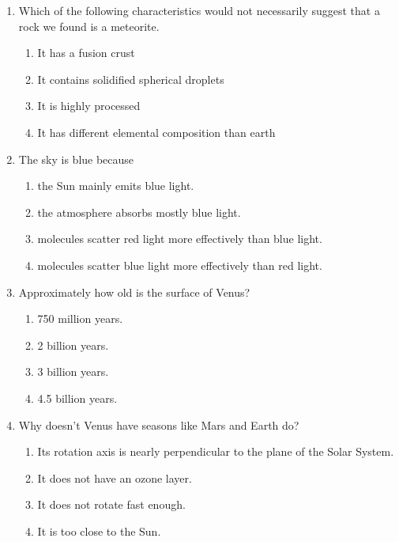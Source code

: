 \documentclass[12pt]{article}
\begin{document}
\begin{enumerate}[label=\arabic*.]
\begin{enumerate}[label=(\alph*)]
    \item Because the atmosphere preferentially scatters short wavelengths.
    \item Because the Earth's atmosphere preferentially absorbs all other colors.
\end{enumerate}
\item Which of the following characteristics would not necessarily suggest that a rock we found is a meteorite.
\begin{enumerate}[label=(\alph*)]
    \item It has a fusion crust
    \item It contains solidified spherical droplets
    \item It is highly processed
    \item It has different elemental composition than earth
\end{enumerate}
\item The sky is blue because
\begin{enumerate}[label=(\alph*)]
    \item the Sun mainly emits blue light.
    \item the atmosphere absorbs mostly blue light.
    \item molecules scatter red light more effectively than blue light.
    \item molecules scatter blue light more effectively than red light.
\end{enumerate}
\item Approximately how old is the surface of Venus?
\begin{enumerate}[label=(\alph*)]
    \item 750 million years.
    \item 2 billion years.
    \item 3 billion years.
    \item 4.5 billion years.
\end{enumerate}
\item Why doesn't Venus have seasons like Mars and Earth do?
\begin{enumerate}[label=(\alph*)]
    \item Its rotation axis is nearly perpendicular to the plane of the Solar System.
    \item It does not have an ozone layer.
    \item It does not rotate fast enough.
    \item It is too close to the Sun.
\end{enumerate}

\end{enumerate}
\end{document}
